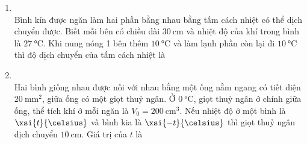 \begin{enumerate}[label=\bfseries Câu \arabic*:, leftmargin=1.7cm]

\item {}\\
Bình kín được ngăn làm hai phần bằng nhau bằng tấm cách nhiệt có thể dịch chuyển được. Biết mỗi bên có chiều dài $\SI{30}{\centi\meter}$ và nhiệt độ của khí trong bình là $\SI{27}{\celsius}$. Khi nung nóng 1 bên thêm $\SI{10}{\celsius}$ và làm lạnh phần còn lại đi $\SI{10}{\celsius}$ thì độ dịch chuyển của tấm cách nhiệt là



\item {}\\
Hai bình giống nhau được nối với nhau bằng một ống nằm ngang có tiết diện $\SI{20}{\milli\meter^2}$, giữa ống có một giọt thuỷ ngân. Ở $\SI{0}{\celsius}$, giọt thuỷ ngân ở chính giữa ống, thể tích khí ở mỗi ngăn là $V_0=\SI{200}{\centi\meter^3}$. Nếu nhiệt độ ở một bình là $\xsi{t}{\celsius}$ và bình kia là $\xsi{-t}{\celsius}$ thì giọt thuỷ ngân dịch chuyển $\SI{10}{\centi\meter}$. Giá trị của $t$ là



\end{enumerate}
